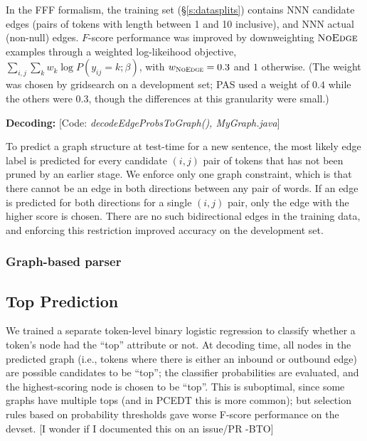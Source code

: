\documentclass[11pt]{article}
\newcommand{\bocomment}[1]{\textcolor{Bittersweet}{[#1 -BTO]}}
\newcommand{\codenote}[1]{\textcolor{PineGreen}{[Code: \emph{#1}]}}
\newcommand{\noedge}{\textsc{NoEdge}}
\begin{document}
In the FFF formalism, the training set (\S\ref{s:datasplits})
contains NNN candidate edges (pairs of tokens with length between 1 and 10 inclusive),
and NNN actual (non-null) edges.  $F$-score performance was improved by
downweighting $\noedge$ examples through a weighted log-likeihood objective,
$\sum_{i,j} \sum_k w_k \log P(y_{ij}=k;\beta)$, with $w_{\noedge}=0.3$ and $1$ otherwise.  
(The weight was chosen by gridsearch on a development set; 
PAS used a weight of $0.4$ while the others were $0.3$, though the differences at this granularity were small.)



\textbf{Decoding:}
\codenote{decodeEdgeProbsToGraph(), MyGraph.java}

To predict a graph structure at test-time for a new sentence,
the most likely edge label is predicted for every candidate $(i, j)$ pair of
tokens that has not been pruned by an earlier stage.
We enforce only one graph constraint, which is that there cannot be
an edge in both directions between any pair of words.
If an edge is predicted for both directions for a single $(i, j)$
pair, only the edge with the higher score is chosen.
There are no such bidirectional edges in the training data, and enforcing this
restriction improved accuracy on the development set.%



\subsubsection{Graph-based parser} \label{s:graphparser}

\subsection{Top Prediction} \label{s:top_model}

We trained a separate token-level binary logistic regression to classify
whether a token's node had the ``top'' attribute or not.
At decoding time, all nodes in the predicted graph (i.e., tokens where there is
either an inbound or outbound edge) are possible candidates to be ``top'';
the classifier probabilities are evaluated, and the highest-scoring node is
chosen to be ``top''.
This is suboptimal, since some graphs have multiple tops (and in PCEDT this is
more common);
but selection rules based on probability thresholds gave worse F-score
performance on the devset. \bocomment{I wonder if I documented this on an issue/PR}
\end{document}

